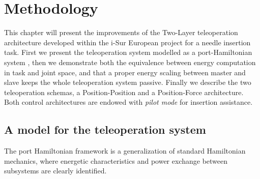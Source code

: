 \chapter{Methodology} \label{chap:methodology}

This chapter will present the improvements of the Two-Layer teleoperation architecture developed within the i-Sur European project \cite{Ferraguti2015} for a needle insertion task.
First we present the teleoperation system modelled as a port-Hamiltonian system \cite{Ferraguti2015}, then we demonstrate both the equivalence between energy computation in task and joint space, and that a proper energy scaling between master and slave keeps the whole teleoperation system passive.
Finally we describe the two teleoperation schemas, a Position-Position and a Position-Force architecture. Both control architectures are endowed with \textit{pilot mode} for insertion assistance.


\section{A model for the teleoperation system}
The port Hamiltonian framework is a generalization of standard Hamiltonian mechanics, where energetic characteristics and power exchange between subsystems are clearly identified.
